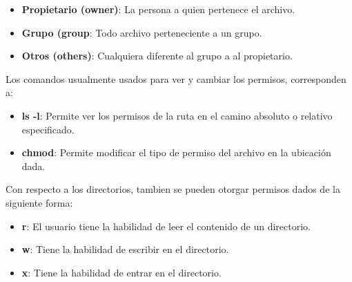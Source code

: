 \documentclass[a4paper,12pt]{article}
\begin{document}
\begin{itemize}
\item{\textbf{Propietario (owner)}}: La persona a quien pertenece el archivo.
\item{\textbf{Grupo (group}}: Todo archivo perteneciente a un grupo.
\item{\textbf{Otros (others)}}: Cualquiera diferente al grupo a al propietario.
\end{itemize}

Los comandos usualmente usados para ver y cambiar los permisos, corresponden a:

\begin{itemize}
\item{\textbf{ls -l}}: Permite ver los permisos de la ruta en el camino absoluto o relativo especificado.
\item{\textbf{chmod}}: Permite modificar el tipo de permiso del archivo en la ubicación dada.
\end{itemize}

Con respecto a los directorios, tambien se pueden otorgar permisos dados de la siguiente forma:

\begin{itemize}
\item{\textbf{r}}: El usuario tiene la habilidad de leer el contenido de un directorio.
\item{\textbf{w}}: Tiene la habilidad de escribir en el directorio.
\item{\textbf{x}}: Tiene la habilidad de entrar en el directorio.
\end{itemize}
\end{document}

